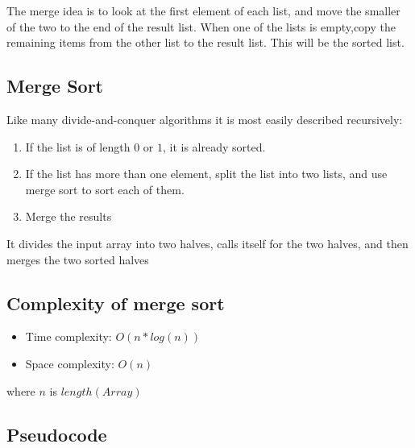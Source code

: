 \documentclass{article}
\begin{document}
The merge idea is to look at the first element of each list, and move the smaller of the two to the end of the result list. When one of the lists is empty,copy the remaining items from the other list to the result list. This will be the sorted list.

\subsection{Merge Sort}

Like many divide-and-conquer algorithms it is most easily described recursively:
\begin{enumerate}
    \item  If the list is of length $0$ or $1$, it is already sorted.
    \item  If the list has more than one element, split the list into two lists, and use merge sort to sort each of them.
    \item  Merge the results
\end{enumerate}

It divides the input array into two halves, calls itself for the two halves, and then merges the two sorted halves

\subsection{Complexity of merge sort}

\begin{itemize}
    \item Time complexity: $O(n*log(n))$
    \item Space complexity: $O(n)$
\end{itemize}
where $n$ is $length(Array)$

\subsection{Pseudocode}
\end{document}
